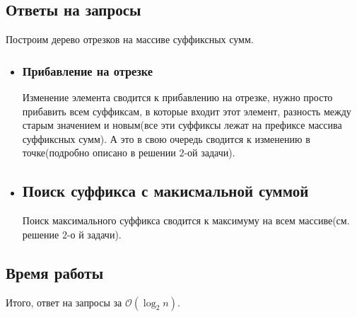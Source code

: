 \documentclass{article}
\begin{document}
\subsection*{Ответы на запросы}
Построим дерево отрезков на массиве суффиксных сумм.
\begin{itemize}
\item[\RomanNumeralCaps{1}]
\subsubsection*{Прибавление на отрезке} Изменение элемента сводится к прибавлению на отрезке, нужно просто прибавить всем суффиксам, в которые входит этот элемент, разность между старым значением и новым(все эти суффиксы лежат на префиксе массива суффиксных сумм). А это в свою очередь сводится к изменению в точке(подробно описано в решении $2$-ой задачи).
\item[\RomanNumeralCaps{2}]
\subsection*{Поиск суффикса с макисмальной суммой}
Поиск максимального суффикса сводится к максимуму на всем массиве(см. решение $2$-о	й задачи).
\end{itemize}
\subsection*{Время работы}
Итого, ответ на запросы за $\mathcal{O}(\log_2{n})$.
\end{document}
